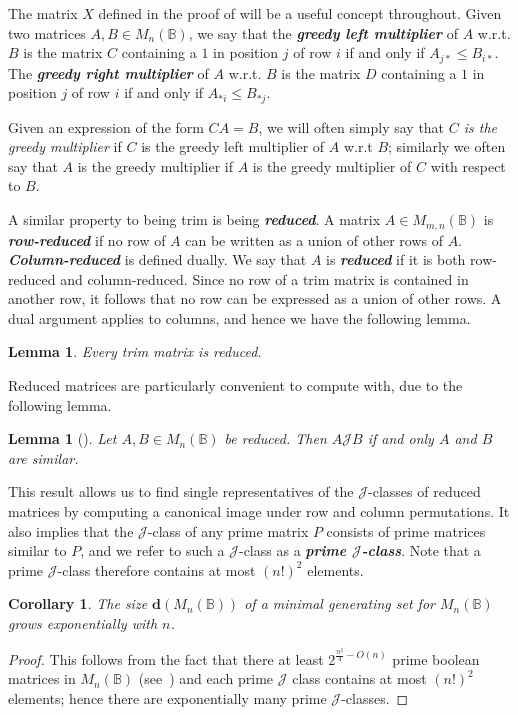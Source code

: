 \documentclass[11pt]{article}
\newtheorem{cor}[thm]{Corollary}
\newtheorem{lemma}[thm]{Lemma}
\newcommand{\defn}[1]{\textbf{\textit{#1}}}
\numberwithin{equation}{section}
\newcommand{\B}{\mathbb{B}}
\newcommand{\Bn}{M_n(\B)}
\newcommand{\Bmn}{M_{m,n}(\B)}
\newcommand{\J}{\mathscr{J}}
\begin{document}
The matrix $X$ defined in the proof of  will be
a useful concept throughout. Given two matrices $A, B \in \Bn$, we say that the
\defn{greedy left multiplier} of $A$ w.r.t. $B$ is the matrix $C$ containing a
$1$ in position $j$ of row $i$ if and only if $A_{j*} \leq B_{i*}$. The
\defn{greedy right multiplier} of $A$ w.r.t. $B$ is the matrix $D$ containing a
$1$ in position $j$ of row $i$ if and only if $A_{*i} \leq B_{*j}$.

Given an expression of the form $CA = B$, we will often simply say that
\emph{$C$ is the greedy multiplier} if $C$ is the greedy left multiplier of $A$
w.r.t $B$; similarly we often say that $A$ is the greedy multiplier if $A$ is
the greedy multiplier of $C$ with respect to $B$.

A similar property to being trim is being \defn{reduced}. A matrix $A \in \Bmn$
is \defn{row-reduced} if no row of $A$ can be written as a union of other rows
of $A$. \defn{Column-reduced} is defined dually. We say that $A$ is
\defn{reduced} if it is both row-reduced and column-reduced. Since no row of a
trim matrix is contained in another row, it follows that no row can be expressed
as a union of other rows. A dual argument applies to columns, and hence we have
the following lemma.

\begin{lemma}
  Every trim matrix is reduced.
\end{lemma}

Reduced matrices are particularly convenient to compute with, due to the
following lemma. 
\begin{lemma}[\cite{Plemmons1970aa}]
  Let $A, B \in \Bn$ be reduced. Then $A \J B$ if and only $A$ and $B$ are
  similar.
\end{lemma}

This result allows us to find single representatives of the $\J$-classes of
reduced matrices by computing a canonical image under row and column
permutations. It also implies that the $\J$-class of any prime matrix $P$
consists of prime matrices similar to $P$, and we refer to such a $\J$-class as
a \defn{prime $\J$-class}. Note that a prime $\J$-class therefore contains at
most $(n!)^2$ elements.

\begin{cor}
  The size $\mathbf{d}(\Bn)$ of a minimal generating set for $\Bn$ grows
  exponentially with $n$.
\end{cor}
\begin{proof}
  This follows from the fact that there at least $2^{\frac{n^2}{4} - O(n)}$
  prime boolean matrices in $\Bn$ (see~\cite[Theorem 2.4.1]{Kim1982aa}) and each
  prime $\J$ class contains at most $(n!)^2$ elements; hence there are
  exponentially many prime $\J$-classes.
\end{proof}
\end{document}

